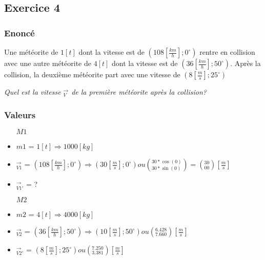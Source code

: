 \subsection{Exercice 4}
\subsubsection{Enoncé}
Une météorite de $1[t]$ dont la vitesse est de $(108[\frac{km}{h}];0^\circ)$ rentre en collision avec une autre météorite de $4[t]$ dont la vitesse est de $(36[\frac{km}{h}];50^\circ)$.
Après la collision, la deuxième météorite part avec une vitesse de $(8[\frac{m}{s}];25^\circ)$

\textit{Quel est la vitesse $_{V}^\rightarrow$ de la première météorite après la collision?}

\subsubsection{Valeurs}
\begin{itemize}
    \item[\textbf{$M1$}]
    \item $m1$ = $1[t] \Rightarrow 1000[kg]$
    \item $_{V1}^{\rightarrow}$ = $ (108[\frac{km}{h}];0^\circ) \Rightarrow (30[\frac{m}{s}];0^\circ) ou (^{30*\cos(0)}_{30*\sin(0)})=(^{30}_{00})[\frac{m}{s}]$
    \item $_{V1'}^{\rightarrow}$ = ?
    \item[\textbf{$M2$}]
    \item $m2$ = $4[t] \Rightarrow 4000[kg]$
    \item $_{V2}^{\rightarrow}$ = $ (36[\frac{km}{h}];50^\circ) \Rightarrow (10[\frac{m}{s}];50^\circ) ou (^{6.428}_{7.660})[\frac{m}{s}]$ 
    \item $_{V2'}^{\rightarrow}$ = $(8[\frac{m}{s}];25^\circ) ou (^{7.250}_{3.381})[\frac{m}{s}]$
\end{itemize}

